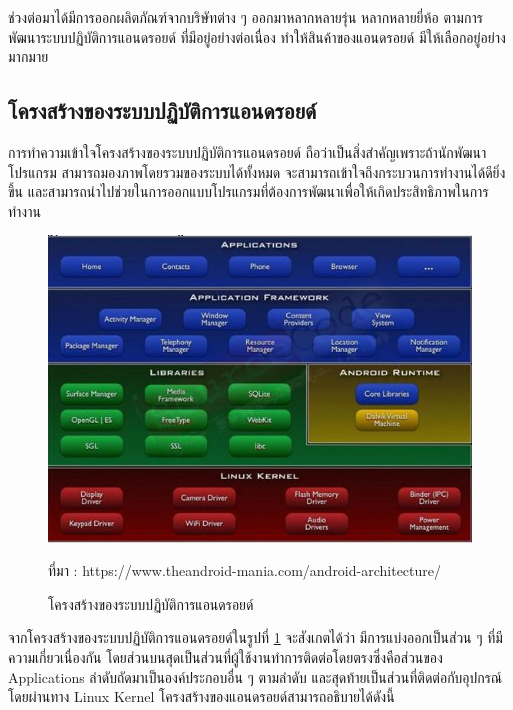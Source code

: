 	ช่วงต่อมาได้มีการออกผลิตภัณฑ์จากบริษัทต่าง ๆ ออกมาหลากหลายรุ่น หลากหลายยี่ห้อ ตามการพัฒนาระบบปฏิบัติการแอนดรอยด์ ที่มีอยู่อย่างต่อเนื่อง ทำให้สินค้าของแอนดรอยด์ มีให้เลือกอยู่อย่างมากมาย
	
	\subsection{โครงสร้างของระบบปฏิบัติการแอนดรอยด์}
	การทำความเข้าใจโครงสร้างของระบบปฏิบัติการแอนดรอยด์ \cite{androidbook1} ถือว่าเป็นสิ่งสำคัญเพราะถ้านักพัฒนาโปรแกรม สามารถมองภาพโดยรวมของระบบได้ทั้งหมด จะสามารถเข้าใจถึงกระบวนการทำงานได้ดียิ่งขึ้น และสามารถนำไปช่วยในการออกแบบโปรแกรมที่ต้องการพัฒนาเพื่อให้เกิดประสิทธิภาพในการทำงาน
	
	\begin{figure}[H]
		\centering
		\includegraphics[width=0.8\columnwidth]{Figures/2/androidarchitecture}
		\caption{โครงสร้างของระบบปฏิบัติการแอนดรอยด์}{ที่มา : https://www.theandroid-mania.com/android-architecture/}
		\label{Fig:androidarchitecture}
	\end{figure}
	จากโครงสร้างของระบบปฏิบัติการแอนดรอยด์ในรูปที่ \ref{Fig:androidarchitecture} จะสังเกตได้ว่า มีการแบ่งออกเป็นส่วน ๆ ที่มีความเกี่ยวเนื่องกัน โดยส่วนบนสุดเป็นส่วนที่ผู้ใช้งานทำการติดต่อโดยตรงซึ่งคือส่วนของ Applications ลำดับถัดมาเป็นองค์ประกอบอื่น ๆ ตามลำดับ และสุดท้ายเป็นส่วนที่ติดต่อกับอุปกรณ์โดยผ่านทาง Linux Kernel โครงสร้างของแอนดรอยด์สามารถอธิบายได้ดังนี้

